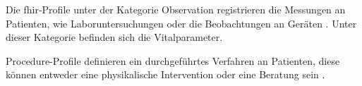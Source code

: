 Die \ac{fhir}-Profile unter der Kategorie \glqq Observation\grqq{} registrieren die Messungen an Patienten, wie Laboruntersuchungen oder die Beobachtungen an Geräten \cite{observation}. Unter dieser Kategorie befinden sich die Vitalparameter.

\glqq Procedure\grqq{}-Profile definieren ein durchgeführtes Verfahren an Patienten, diese können entweder eine physikalische Intervention oder eine Beratung sein \cite{procedure}.
